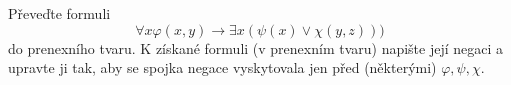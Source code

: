 \subsubsection{}
Převeďte formuli $$\forall x \varphi (x,y) \rightarrow \exists x(\psi(x)\vee
\chi (y,z)))$$ do prenexního tvaru. K získané formuli (v prenexním tvaru)
napište její negaci a upravte ji tak, aby se spojka negace vyskytovala jen před
(některými) $\varphi, \psi, \chi$.
